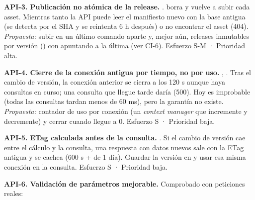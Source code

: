 \textbf{API-3. Publicación no atómica de la release.} .  borra y vuelve a subir cada asset. Mientras tanto la API puede leer el manifiesto nuevo con la base antigua (se detecta por el SHA y se reintenta 6 h después) o no encontrar el asset (404). \emph{Propuesta:} subir  en un último comando aparte y, mejor aún, releases inmutables por versión () con  apuntando a la última (ver CI-6). Esfuerzo S-M · Prioridad alta.

\textbf{API-4. Cierre de la conexión antigua por tiempo, no por uso.} , . Tras el cambio de versión, la conexión anterior se cierra a los 120 s aunque haya consultas en curso; una consulta que llegue tarde daría  (500). Hoy es improbable (todas las consultas tardan menos de 60 ms), pero la garantía no existe. \emph{Propuesta:} contador de uso por conexión (un \emph{context manager} que incremente y decremente) y cerrar cuando llegue a 0. Esfuerzo S · Prioridad baja.

\textbf{API-5. ETag calculada antes de la consulta.} . Si el cambio de versión cae entre el cálculo y la consulta, una respuesta con datos nuevos sale con la ETag antigua y se cachea (600 s +  de 1 día). Guardar la versión en  y usar esa misma conexión en la consulta. Esfuerzo S · Prioridad baja.

\textbf{API-6. Validación de parámetros mejorable.} Comprobado con peticiones reales:

